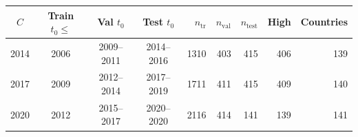 \begin{tabular}{@{}ccccrrrrr@{}}
\toprule
$C$ & Train $t_0\le$ & Val $t_0$ & Test $t_0$ & $n_{\mathrm{tr}}$ & $n_{\mathrm{val}}$ & $n_{\mathrm{test}}$ & High & Countries \\
\midrule
2014 & 2006 & 2009--2011 & 2014--2016 & 1310 & 403 & 415 & 406 & 139 \\
2017 & 2009 & 2012--2014 & 2017--2019 & 1711 & 411 & 415 & 409 & 140 \\
2020 & 2012 & 2015--2017 & 2020--2020 & 2116 & 414 & 141 & 139 & 141 \\
\bottomrule
\end{tabular}
